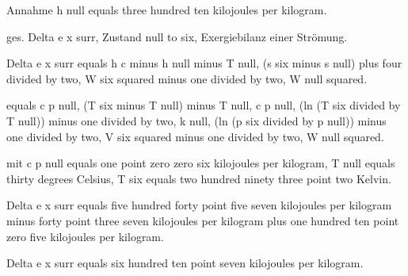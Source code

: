 Annahme h null equals three hundred ten kilojoules per kilogram.

ges. Delta e x surr, Zustand null to six, Exergiebilanz einer Strömung.

Delta e x surr equals h c minus h null minus T null, (s six minus s null) plus four divided by two, W six squared minus one divided by two, W null squared.

equals c p null, (T six minus T null) minus T null, c p null, (ln (T six divided by T null)) minus one divided by two, k null, (ln (p six divided by p null)) minus one divided by two, V six squared minus one divided by two, W null squared.

mit c p null equals one point zero zero six kilojoules per kilogram, T null equals thirty degrees Celsius, T six equals two hundred ninety three point two Kelvin.

Delta e x surr equals five hundred forty point five seven kilojoules per kilogram minus forty point three seven kilojoules per kilogram plus one hundred ten point zero five kilojoules per kilogram.

Delta e x surr equals six hundred ten point seven kilojoules per kilogram.